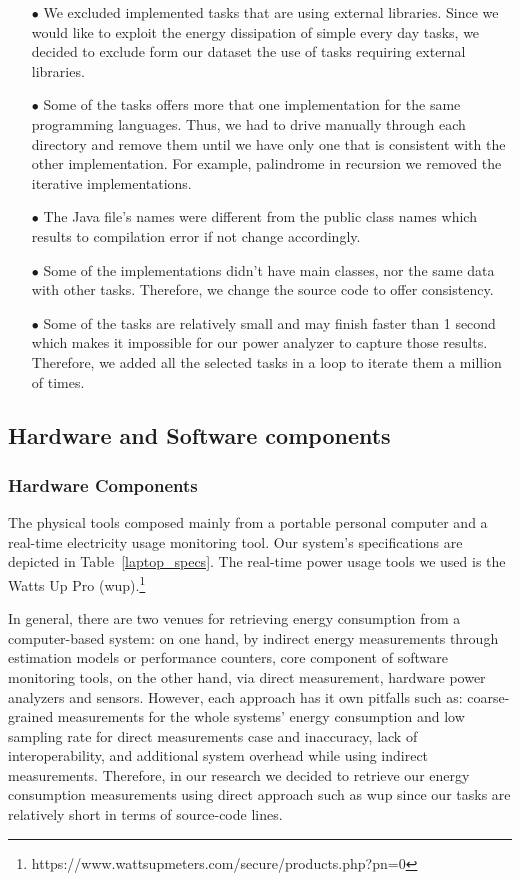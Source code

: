 \begin{enumerate}
	\item [$\bullet$] We excluded implemented tasks that are using 
	external libraries. 
	Since we would like to exploit the energy dissipation of 
	simple every day tasks, we decided to exclude form our dataset 
	the use of tasks requiring external libraries. 
	\item [$\bullet$] Some of the tasks offers more that one implementation 
	for the same programming languages. 
	Thus, we had to drive manually through each directory and remove 
	them until we have only one that is consistent with the other 
	implementation. 
	For example, palindrome in recursion we removed the iterative 
	implementations. 
	\item [$\bullet$] The Java file's names were 
	different from the public class names which results to compilation 
	error if not change accordingly. 
	\item [$\bullet$] Some of the implementations didn't have main 
	classes, nor the same data with other tasks. 
	Therefore, we change the source code to offer consistency.
	\item [$\bullet$] Some of the tasks are relatively small and may 
	finish faster than 1 second which makes it impossible for our 
	power analyzer to capture those results. 
	Therefore, we added all the selected tasks in a loop to iterate them 
	a million of times. 
\end{enumerate}


\subsection{Hardware and Software components}

\subsubsection{Hardware Components}
The physical tools composed mainly from a portable personal 
computer and a real-time electricity usage monitoring tool.
Our system's specifications are depicted in Table~\ref{laptop_specs}. 
The real-time power usage tools we used is the Watts Up Pro ({\sc wup}).\footnote{https://www.wattsupmeters.com/secure/products.php?pn=0} 

In general, there are two venues for retrieving energy consumption 
from a computer-based system: on one hand, by indirect energy measurements 
through estimation models or performance counters, core component 
of software monitoring tools, on the other hand, via direct measurement, 
hardware power analyzers and sensors.  
However, each approach has it own pitfalls such as: coarse-grained 
measurements for the whole systems' energy consumption and low sampling 
rate for direct measurements case and inaccuracy, lack of interoperability, 
and additional system overhead while using indirect measurements. 
Therefore, in our research we decided to retrieve our energy consumption 
measurements using direct approach such as {\sc wup} since our 
tasks are relatively short in terms of source-code lines.


